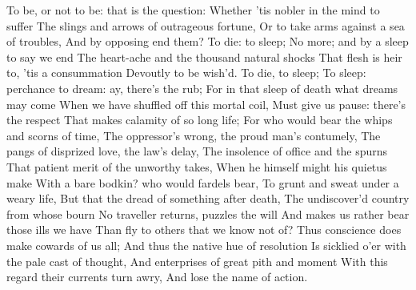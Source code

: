\color{white}
To be, or not to be: that is the question: 
Whether 'tis nobler in the mind to suffer 
The slings and arrows of outrageous fortune, 
Or to take arms against a sea of troubles,		
And by opposing end them? To die: to sleep; 
No more; and by a sleep to say we end 
The heart-ache and the thousand natural shocks
That flesh is heir to, 'tis a consummation 
Devoutly to be wish'd. To die, to sleep;
To sleep: perchance to dream: ay, there's the rub;
For in that sleep of death what dreams may come 
When we have shuffled off this mortal coil, 
Must give us pause: there's the respect 
That makes calamity of so long life;	
For who would bear the whips and scorns of time,
The oppressor's wrong, the proud man's contumely, 
The pangs of disprized love, the law's delay, 
The insolence of office and the spurns 
That patient merit of the unworthy takes, 
When he himself might his quietus make 
With a bare bodkin? who would fardels bear, 
To grunt and sweat under a weary life, 
But that the dread of something after death,
The undiscover'd country from whose bourn 
No traveller returns, puzzles the will 
And makes us rather bear those ills we have 
Than fly to others that we know not of?	
Thus conscience does make cowards of us all; 
And thus the native hue of resolution 
Is sicklied o'er with the pale cast of thought,
And enterprises of great pith and moment 
With this regard their currents turn awry, 
And lose the name of action.
\color{black}